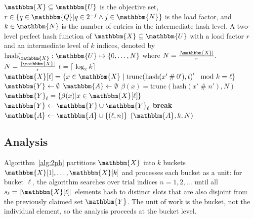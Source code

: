 \documentclass[hidelinks,11pt,final]{article}
\theoremstyle{plain}
\newcommand{\cat}{\mathbin{\#}}
\newcommand{\Break}{\textbf{break}}
\begin{document}
\begin{algorithm}
	\caption{Two-level perfect hash function constructor}
	\label{alg:2ph}
	\KwIn
	{
		$\mathbbm{X} \subseteq \mathbbm{U}$ is the objective set, $r \in \{q \in \mathbbm{Q} | q \in 2^{-j} \land j \in \mathbbm{N}\}$ is the load factor, and $k \in \mathbbm{N}$ is the number of entries in the intermediate hash level.
	}
	\KwOut
	{
		A two-level perfect hash function of $\mathbbm{X} \subseteq \mathbbm{U}$ with a load factor $r$ and an intermediate level of $k$ indices, denoted by $\mathrm{hash}_{\mathbbm{X}}^{r} : \mathbbm{U} \mapsto \left\{0,\ldots,N\right\}$ where $N = \frac{|\mathbbm{X}|}{r}$.
	}
	{
		$N = \frac{|\mathbbm{X}|}{r}$\;
		$t = \lceil \log_2 k \rceil$\;
		$\mathbbm{X}[\ell] = \{x \in \mathbbm{X} \mid \mathrm{trunc}\!\left(\mathrm{hash}(x' \cat 0'),t\right)' \mod k = \ell\}$\;
		$\mathbbm{Y} \gets \emptyset$\;
		$\mathbbm{A} \gets \emptyset$\;		
		{
			{
				$\beta(x) = \mathrm{trunc}\!\left(\mathrm{hash}(x' \cat n'),N\right)$\;
				$\mathbbm{Y}_\ell = \{\beta(x) | x \in \mathbbm{X}[\ell]\}$\;
				{
					$\mathbbm{Y} \gets \mathbbm{Y} \cup \mathbbm{Y}_\ell$\;
					\Break\;
				}
			}
			$\mathbbm{A} \gets \mathbbm{A} \cup \{(\ell,n)\}$\;
		}
		\Return $(\mathbbm{A},k,N)$
	}
\end{algorithm}

\subsection{Analysis}
Algorithm~\ref{alg:2ph} partitions $\mathbbm{X}$ into $k$ buckets $\mathbbm{X}[1],\ldots,\mathbbm{X}[k]$ and processes each bucket as a unit: for bucket $\ell$, the algorithm searches over trial indices $n = 1, 2, \ldots$ until all $s_\ell = |\mathbbm{X}[\ell]|$ elements hash to distinct slots that are also disjoint from the previously claimed set $\mathbbm{Y}$.
The unit of work is the bucket, not the individual element, so the analysis proceeds at the bucket level.
\end{document}
